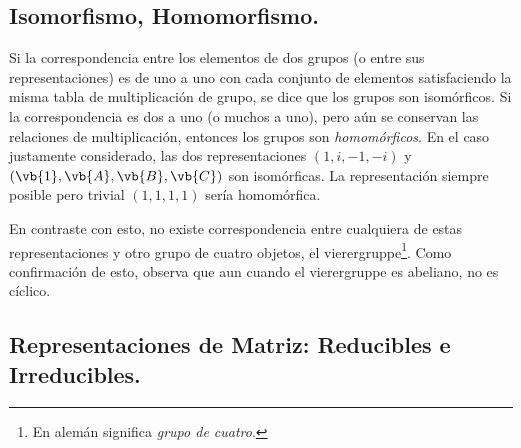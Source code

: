 \subsection{Isomorfismo, Homomorfismo.}

Si la correspondencia entre los elementos de dos grupos (o entre sus representaciones) es de uno a uno con cada conjunto de elementos satisfaciendo la misma tabla de multiplicación de grupo, se dice que los grupos son isomórficos. Si la correspondencia es dos a uno (o muchos a uno), pero aún se conservan las relaciones de multiplicación, entonces los grupos son \emph{homomórficos}. En el caso justamente considerado, las dos representaciones $(1, i, -1, -i)$ y $(\vb{1}, \vb{A}, \vb{B}, \vb{C})$ son isomórficas. La representación siempre posible pero trivial $(1, 1, 1, 1)$ sería homomórfica.
\par
En contraste con esto, no existe correspondencia entre cualquiera de estas representaciones y otro grupo de cuatro objetos, el vierergruppe\footnote{En alemán significa \emph{grupo de cuatro}.}. Como confirmación de esto, observa que aun cuando el vierergruppe es abeliano, no es cíclico.

\subsection{Representaciones de Matriz: Reducibles e Irreducibles.}

